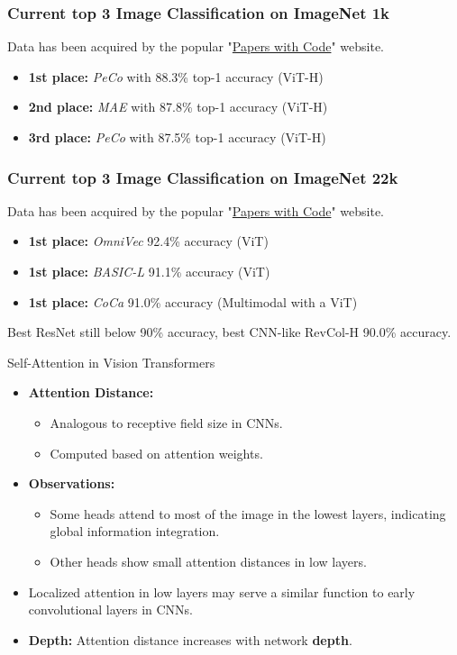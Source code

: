 \begin{frame}
\frametitle{Current top 3 Image Classification on ImageNet 1k}
Data has been acquired by the popular "\href{https://paperswithcode.com/sota/image-classification-on-imagenet?tag_filter=171}{Papers with Code}" website.


\begin{itemize}
    \item \textbf{1st place:} \textit{PeCo} with 88.3\% top-1 accuracy (ViT-H)
    \item \textbf{2nd place:} \textit{MAE} with 87.8\% top-1 accuracy (ViT-H)
    \item \textbf{3rd place:} \textit{PeCo} with 87.5\% top-1 accuracy (ViT-H)
\end{itemize}

\end{frame}

\begin{frame}
\frametitle{Current top 3 Image Classification on ImageNet 22k}
Data has been acquired by the popular "\href{https://paperswithcode.com/sota/image-classification-on-imagenet}{Papers with Code}" website.


\begin{itemize}
    \item \textbf{1st place:} \textit{OmniVec} 92.4\% accuracy (ViT)
    \item \textbf{1st place:} \textit{BASIC-L} 91.1\% accuracy (ViT)
    \item \textbf{1st place:} \textit{CoCa} 91.0\% accuracy (Multimodal with a ViT)
\end{itemize}

Best ResNet still below 90\% accuracy, best CNN-like RevCol-H 90.0\% accuracy.

\end{frame}

\begin{frame}{Self-Attention in Vision Transformers}
    \begin{itemize}
        \item \textbf{Attention Distance:} 
        \begin{itemize}
            \item Analogous to receptive field size in CNNs.
            \item Computed based on attention weights.
        \end{itemize}
        \item \textbf{Observations:}
        \begin{itemize}
            \item Some heads attend to most of the image in the lowest layers, indicating global information integration.
            \item Other heads show small attention distances in low layers.
        \end{itemize}
        \item Localized attention in low layers may serve a similar function to early convolutional layers in CNNs.
        \item \textbf{Depth:} Attention distance increases with network \textbf{depth}.
    \end{itemize}
\end{frame}